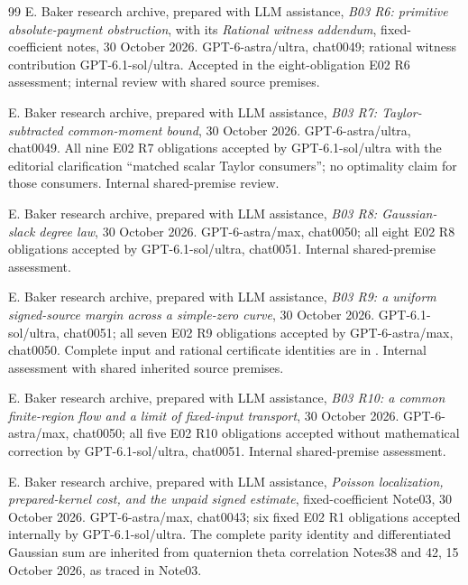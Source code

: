 \documentclass[11pt]{article}
\numberwithin{equation}{section}
\begin{document}
\begin{thebibliography}{99}
E. Baker research archive, prepared with LLM assistance,
\emph{B03 R6: primitive absolute-payment obstruction}, with its
\emph{Rational witness addendum}, fixed-coefficient notes,
30 October 2026. GPT-6-astra/ultra, chat0049; rational witness
contribution GPT-6.1-sol/ultra. Accepted in the eight-obligation
E02 R6 assessment; internal review with shared source premises.

E. Baker research archive, prepared with LLM assistance,
\emph{B03 R7: Taylor-subtracted common-moment bound},
30 October 2026. GPT-6-astra/ultra, chat0049.
All nine E02 R7 obligations accepted by GPT-6.1-sol/ultra with the
editorial clarification ``matched scalar Taylor consumers'';
no optimality claim for those consumers. Internal shared-premise review.

E. Baker research archive, prepared with LLM assistance,
\emph{B03 R8: Gaussian-slack degree law}, 30 October 2026.
GPT-6-astra/max, chat0050; all eight E02 R8 obligations accepted
by GPT-6.1-sol/ultra, chat0051. Internal shared-premise assessment.

E. Baker research archive, prepared with LLM assistance,
\emph{B03 R9: a uniform signed-source margin across a simple-zero
curve}, 30 October 2026. GPT-6.1-sol/ultra, chat0051;
all seven E02 R9 obligations accepted by GPT-6-astra/max, chat0050.
Complete input and rational certificate identities are in
.
Internal assessment with shared inherited source premises.

E. Baker research archive, prepared with LLM assistance,
\emph{B03 R10: a common finite-region flow and a limit of fixed-input
transport}, 30 October 2026. GPT-6-astra/max, chat0050;
all five E02 R10 obligations accepted without mathematical correction
by GPT-6.1-sol/ultra, chat0051. Internal shared-premise assessment.

E. Baker research archive, prepared with LLM assistance,
\emph{Poisson localization, prepared-kernel cost, and the unpaid signed
estimate}, fixed-coefficient Note03, 30 October 2026.
GPT-6-astra/max, chat0043; six fixed E02 R1 obligations accepted
internally by GPT-6.1-sol/ultra. The complete parity identity and
differentiated Gaussian sum are inherited from quaternion theta
correlation Notes38 and 42, 15 October 2026, as traced in Note03.


\end{thebibliography}
\end{document}
